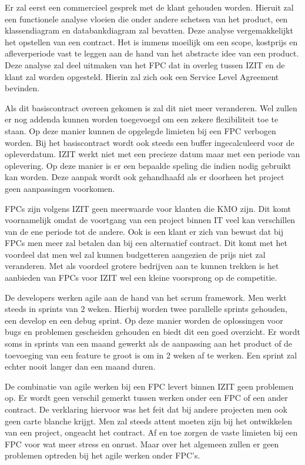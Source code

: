 \documentclass{hogent-article}
\begin{document}
    Er zal eerst een commercieel gesprek met de klant gehouden worden. Hieruit zal een functionele analyse vloeien die onder andere schetsen van het product, een klassendiagram en databankdiagram zal bevatten. Deze analyse vergemakkelijkt het opstellen van een contract. Het is immens moeilijk om een scope, kostprijs en afleverperiode vast te leggen aan de hand van het abstracte idee van een product. Deze analyse zal deel uitmaken van het FPC dat in overleg tussen IZIT en de klant zal worden opgesteld. Hierin zal zich ook een Service Level Agreement bevinden.
    
    Als dit basiscontract overeen gekomen is zal dit niet meer veranderen. Wel zullen er nog addenda kunnen worden toegevoegd om een zekere flexibiliteit toe te staan. Op deze manier kunnen de opgelegde limieten bij een FPC verbogen worden. Bij het basiscontract wordt ook steeds een buffer ingecalculeerd voor de opleverdatum. IZIT werkt niet met een precieze datum maar met een periode van oplevering. Op deze manier is er een bepaalde speling die indien nodig gebruikt kan worden. Deze aanpak wordt ook gehandhaafd als er doorheen het project geen aanpassingen voorkomen.
    
    FPCs zijn volgens IZIT geen meerwaarde voor klanten die KMO zijn. Dit komt voornamelijk omdat de voortgang van een project binnen IT veel kan verschillen van de ene periode tot de andere. Ook is een klant er zich van bewust dat bij FPCs men meer zal betalen dan bij een alternatief contract. Dit komt met het voordeel dat men wel zal kunnen budgetteren aangezien de prijs niet zal veranderen. Met als voordeel grotere bedrijven aan te kunnen trekken is het aanbieden van FPCs voor IZIT wel een kleine voorsprong op de competitie.
    
    De developers werken agile aan de hand van het scrum framework. Men werkt steeds in sprints van 2 weken. Hierbij worden twee parallelle sprints gehouden, een develop en een debug sprint. Op deze manier worden de oplossingen voor bugs en problemen gescheiden gehouden en biedt dit een goed overzicht. Er wordt soms in sprints van een maand gewerkt als de aanpassing aan het product of de toevoeging van een feature te groot is om in 2 weken af te werken. Een sprint zal echter nooit langer dan een maand duren. 
    
     De combinatie van agile werken bij een FPC levert binnen IZIT geen problemen op. Er wordt geen verschil gemerkt tussen werken onder een FPC of een ander contract. De verklaring hiervoor was het feit dat bij andere projecten men ook geen carte blanche krijgt. Men zal steeds attent moeten zijn bij het ontwikkelen van een project, ongeacht het contract. Af en toe zorgen de vaste limieten bij een FPC voor wat meer stress en onrust. Maar over het algemeen zullen er geen problemen optreden bij het agile werken onder FPC's.
    
\end{document}
